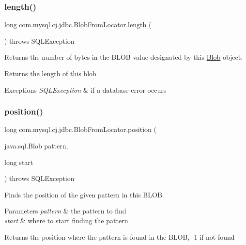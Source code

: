 \subsubsection{\texorpdfstring{length()}{length()}}
{\footnotesize\ttfamily long com.\+mysql.\+cj.\+jdbc.\+Blob\+From\+Locator.\+length (\begin{DoxyParamCaption}{ }\end{DoxyParamCaption}) throws S\+Q\+L\+Exception}

Returns the number of bytes in the B\+L\+OB value designated by this \mbox{\hyperlink{classcom_1_1mysql_1_1cj_1_1jdbc_1_1_blob}{Blob}} object.

\begin{DoxyReturn}{Returns}
the length of this blob
\end{DoxyReturn}

\begin{DoxyExceptions}{Exceptions}
{\em S\+Q\+L\+Exception} & if a database error occurs \\
\hline
\end{DoxyExceptions}
\mbox{\label{classcom_1_1mysql_1_1cj_1_1jdbc_1_1_blob_from_locator_a9883a07889dbe51799cbbddb55396503}} 
\subsubsection{\texorpdfstring{position()}{position()}\hspace{0.1cm}{\footnotesize\ttfamily [1/2]}}
{\footnotesize\ttfamily long com.\+mysql.\+cj.\+jdbc.\+Blob\+From\+Locator.\+position (\begin{DoxyParamCaption}\item[{java.\+sql.\+Blob}]{pattern,  }\item[{long}]{start }\end{DoxyParamCaption}) throws S\+Q\+L\+Exception}

Finds the position of the given pattern in this B\+L\+OB.


\begin{DoxyParams}{Parameters}
{\em pattern} & the pattern to find \\
\hline
{\em start} & where to start finding the pattern\\
\hline
\end{DoxyParams}
\begin{DoxyReturn}{Returns}
the position where the pattern is found in the B\+L\+OB, -\/1 if not found
\end{DoxyReturn}

